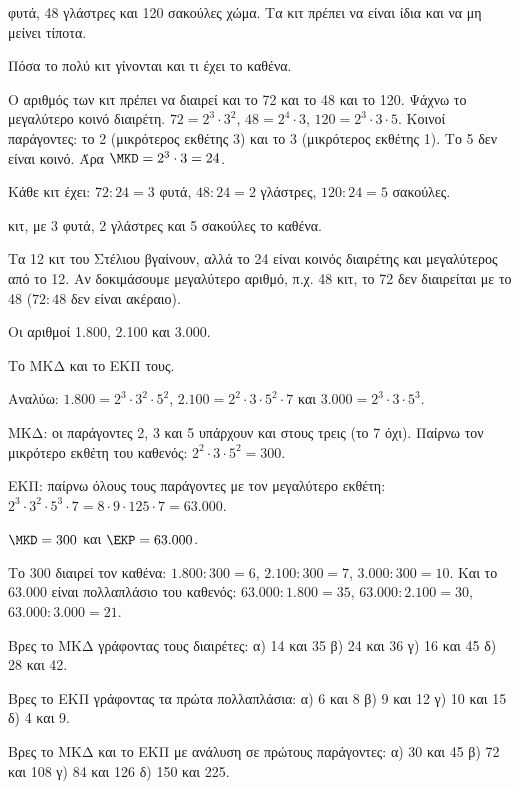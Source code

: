  φυτά, 48 γλάστρες και 120 σακούλες χώμα. Τα κιτ πρέπει να είναι ίδια και να μη μείνει τίποτα.\par
\tithelo Πόσα το πολύ κιτ γίνονται και τι έχει το καθένα.\par
\possindeo Ο αριθμός των κιτ πρέπει να διαιρεί και το 72 και το 48 και το 120. Ψάχνω το μεγαλύτερο κοινό διαιρέτη. $72=2^3\cdot 3^2$, $48=2^4\cdot 3$, $120=2^3\cdot 3\cdot 5$. Κοινοί παράγοντες: το 2 (μικρότερος εκθέτης 3) και το 3 (μικρότερος εκθέτης 1). Το 5 δεν είναι κοινό. Άρα $\MKD=2^3\cdot 3=24$.\par
Κάθε κιτ έχει: $72:24=3$ φυτά, $48:24=2$ γλάστρες, $120:24=5$ σακούλες.\par
{} κιτ, με 3 φυτά, 2 γλάστρες και 5 σακούλες το καθένα.\par
\elegxos Τα 12 κιτ του Στέλιου βγαίνουν, αλλά το 24 είναι κοινός διαιρέτης και μεγαλύτερος από το 12. Αν δοκιμάσουμε μεγαλύτερο αριθμό, π.χ. 48 κιτ, το 72 δεν διαιρείται με το 48 ($72:48$ δεν είναι ακέραιο).

\tixero Οι αριθμοί 1.800, 2.100 και 3.000.\par
\tithelo Το ΜΚΔ και το ΕΚΠ τους.\par
\possindeo Αναλύω: $1.800=2^3\cdot 3^2\cdot 5^2$, $2.100=2^2\cdot 3\cdot 5^2\cdot 7$ και $3.000=2^3\cdot 3\cdot 5^3$.\par
ΜΚΔ: οι παράγοντες 2, 3 και 5 υπάρχουν και στους τρεις (το 7 όχι). Παίρνω τον μικρότερο εκθέτη του καθενός: $2^2\cdot 3\cdot 5^2=300$.\par
ΕΚΠ: παίρνω όλους τους παράγοντες με τον μεγαλύτερο εκθέτη: $2^3\cdot 3^2\cdot 5^3\cdot 7=8\cdot 9\cdot 125\cdot 7=63.000$.\par
\apantisi $\MKD=300$ και $\EKP=63.000$.\par
\elegxos Το 300 διαιρεί τον καθένα: $1.800:300=6$, $2.100:300=7$, $3.000:300=10$. Και το 63.000 είναι πολλαπλάσιο του καθενός: $63.000:1.800=35$, $63.000:2.100=30$, $63.000:3.000=21$.



\ex Βρες το ΜΚΔ γράφοντας τους διαιρέτες: α) 14 και 35 \quad β) 24 και 36 \quad γ) 16 και 45 \quad δ) 28 και 42.

\ex Βρες το ΕΚΠ γράφοντας τα πρώτα πολλαπλάσια: α) 6 και 8 \quad β) 9 και 12 \quad γ) 10 και 15 \quad δ) 4 και 9.

\ex Βρες το ΜΚΔ και το ΕΚΠ με ανάλυση σε πρώτους παράγοντες: α) 30 και 45 \quad β) 72 και 108 \quad γ) 84 και 126 \quad δ) 150 και 225.

